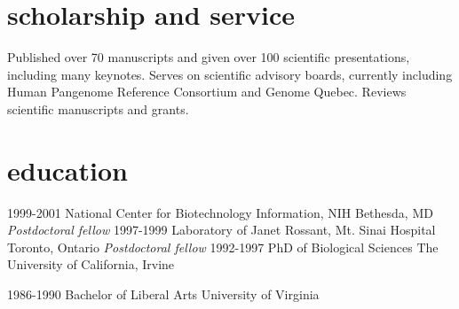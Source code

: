 \documentclass[]{dmc-cv} %
\begin{document}

\section{scholarship and service}
Published over 70 manuscripts and given over 100 scientific presentations, including many keynotes. Serves on scientific advisory boards, currently including Human Pangenome Reference Consortium and Genome Quebec. Reviews scientific manuscripts and grants. \\


\section{education}

\begin{entrylist}
\entry
{1999-2001}
{National Center for Biotechnology Information, NIH}
{Bethesda, MD}
{\emph{Postdoctoral fellow}
}
\entry
{1997-1999}
{Laboratory of Janet Rossant, Mt. Sinai Hospital}
{Toronto, Ontario}
{\emph{Postdoctoral fellow}
}
\entry
{1992-1997}
{PhD {\normalfont of Biological Sciences}}
{The University of California, Irvine}

\entry
{1986-1990}
{Bachelor {\normalfont of Liberal Arts}}
{University of Virginia}

\end{entrylist}

\end{document}
